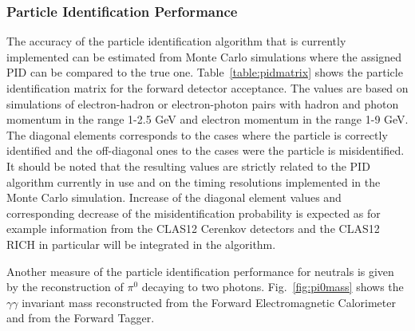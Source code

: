 \subsubsection{Particle Identification Performance}
The accuracy of the particle identification algorithm that is currently implemented can be estimated from Monte Carlo simulations where the assigned PID can be compared to the true one. Table~\ref{table:pidmatrix} shows the particle identification matrix for the forward detector acceptance. The values are based on simulations of electron-hadron or electron-photon pairs with hadron and photon momentum in the range 1-2.5 GeV and electron momentum in the range 1-9 GeV. The diagonal elements corresponds to the cases where the particle is correctly identified and the off-diagonal ones to the cases were the particle is misidentified. It should be noted that the resulting values are strictly related to the PID algorithm currently in use and on the timing resolutions implemented in the Monte Carlo simulation. Increase of the diagonal element values and corresponding decrease of the misidentification probability is expected as for example information from the CLAS12 Cerenkov detectors and the CLAS12 RICH in particular will be integrated in the algorithm.

Another measure of the particle identification performance for neutrals is given by the reconstruction of $\pi^0$ decaying to two photons. Fig.~\ref{fig:pi0mass} shows the $\gamma \gamma$ invariant mass reconstructed from the Forward Electromagnetic Calorimeter and from the Forward Tagger.


